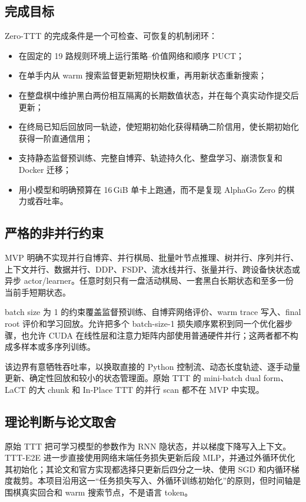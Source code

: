 \documentclass[UTF8,11pt,a4paper]{ctexart}
\newcommand{\projectname}{\textsf{Zero-TTT}}
\begin{document}
\subsection{完成目标}

\projectname{} 的完成条件是一个可检查、可恢复的机制闭环：

\begin{itemize}
  \item 在固定的 19 路规则环境上运行策略--价值网络和顺序 PUCT；
  \item 在单手内从 warm 搜索监督更新短期快权重，再用新状态重新搜索；
  \item 在整盘棋中维护黑白两份相互隔离的长期数值状态，并在每个真实动作提交后更新；
  \item 在终局已知后回放同一轨迹，使短期初始化获得精确二阶信用，使长期初始化获得一阶直通信用；
  \item 支持静态监督预训练、完整自博弈、轨迹持久化、整盘学习、崩溃恢复和 Docker 迁移；
  \item 用小模型和明确预算在 16\,GiB 单卡上跑通，而不是复现 AlphaGo Zero 的棋力或吞吐率。
\end{itemize}

\subsection{严格的非并行约束}

MVP 明确不实现并行自博弈、并行棋局、批量叶节点推理、树并行、序列并行、上下文并行、数据并行、DDP、FSDP、流水线并行、张量并行、跨设备快状态或异步 actor/learner。任意时刻只有一盘活动棋局、一套黑白长期状态和至多一份当前手短期状态。

batch size 为 1 的约束覆盖监督预训练、自博弈网络评价、warm trace 写入、final root 评价和学习回放。允许把多个 batch-size-1 损失顺序累积到同一个优化器步骤，也允许 CUDA 在线性层和注意力矩阵内部使用普通硬件并行；这两者都不构成多样本或多序列训练。

该边界有意牺牲吞吐率，以换取直接的 Python 控制流、动态长度轨迹、逐手动量更新、确定性回放和较小的状态管理面。原始 TTT 的 mini-batch dual form、LaCT 的大 chunk 和 In-Place TTT 的并行 scan 都不在 MVP 中实现\cite{tttoriginal,lact,inplace}。

\subsection{理论判断与论文取舍}

原始 TTT 把可学习模型的参数作为 RNN 隐状态，并以梯度下降写入上下文\cite{tttoriginal}。TTT-E2E 进一步直接使用网络末端任务损失更新后段 MLP，并通过外循环优化其初始化；其论文和官方实现都选择只更新后四分之一块、使用 SGD 和内循环梯度裁剪\cite{ttte2e}。本项目沿用这一“任务损失写入、外循环训练初始化”的原则，但时间轴是围棋真实回合和 warm 搜索节点，不是语言 token。
\end{document}
